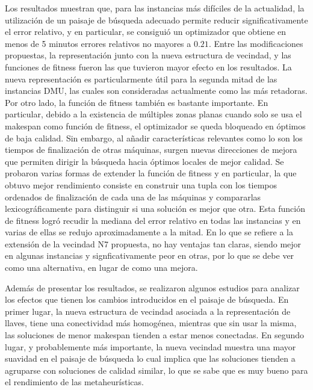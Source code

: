 Los resultados muestran que, para las instancias más difíciles de la actualidad, la utilización de un paisaje de búsqueda adecuado permite reducir
significativamente el error relativo, y en particular, se consiguió un optimizador que obtiene en menos de 5 minutos errores relativos no mayores a $0.21$.
%
Entre las modificaciones propuestas, la representación junto con la nueva estructura de vecindad, y las funciones de fitness fueron las que tuvieron mayor
efecto en los resultados.
%
La nueva representación es particularmente útil para la segunda mitad de las instancias DMU, las cuales son consideradas actualmente como las más retadoras.
%
Por otro lado, la función de fitness también es bastante importante.
%
En particular, debido a la existencia de múltiples zonas planas cuando solo se usa el makespan como función de fitness, el optimizador se queda bloqueado 
en óptimos de baja calidad. 
%
Sin embargo, al añadir características relevantes como lo son los tiempos de finalización de otras máquinas, surgen nuevas direcciones de mejora que permiten 
dirigir la búsqueda hacia óptimos locales de mejor calidad. 
%
Se probaron varias formas de extender la función de fitness y en particular, la que obtuvo mejor rendimiento consiste en construir una tupla con los tiempos 
ordenados de finalización de cada una de las máquinas y compararlas lexicográficamente para distinguir si una solución es mejor que otra. 
%
Esta función de fitness logró recudir la mediana del error relativo en todas las instancias y en varias de ellas se redujo aproximadamente a la mitad.
%
En lo que se refiere a la extensión de la vecindad N7 propuesta, no hay ventajas tan claras, siendo mejor en algunas instancias y signficativamente peor en otras, por 
lo que se debe ver como una alternativa, en lugar de como una mejora.

Además de presentar los resultados, se realizaron algunos estudios para analizar los efectos que tienen los cambios introducidos en el paisaje de búsqueda.
%
En primer lugar, la nueva estructura de vecindad asociada a la representación de llaves, tiene una conectividad más homogénea, mientras que sin usar la misma,
las soluciones de menor makespan tienden a estar menos conectadas.
%
En segundo lugar, y probablemente más importante, la nueva vecindad muestra una mayor suavidad en el paisaje de búsqueda lo cual implica que las soluciones tienden 
a agruparse con soluciones de calidad similar, lo que se sabe que es muy bueno para el rendimiento de las metaheurísticas.
%

